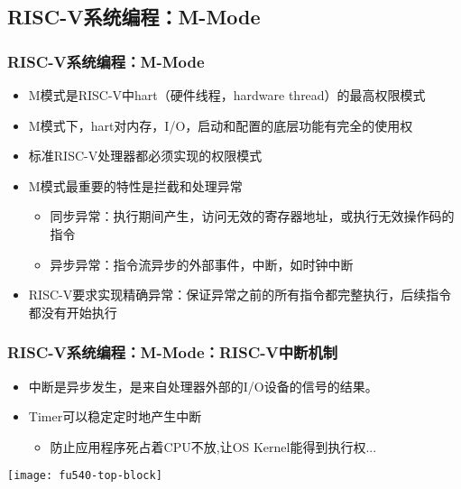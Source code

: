 \subsection{RISC-V系统编程：M-Mode}
\begin{frame}
    \frametitle{RISC-V系统编程：M-Mode}
    \begin{itemize}
        \item M模式是RISC-V中hart（硬件线程，hardware thread）的最高权限模式       
        \item M模式下，hart对内存，I/O，启动和配置的底层功能有完全的使用权
        \item 标准RISC-V处理器都必须实现的权限模式
        \item M模式最重要的特性是拦截和处理异常
        \begin{itemize}
            \item 同步异常：执行期间产生，访问无效的寄存器地址，或执行无效操作码的指令
            \item 异步异常：指令流异步的外部事件，中断，如时钟中断
        \end{itemize}				
        \item RISC-V要求实现精确异常：保证异常之前的所有指令都完整执行，后续指令都没有开始执行
    \end{itemize}
    
\end{frame}


\begin{frame}[plain]
    \frametitle{RISC-V系统编程：M-Mode：RISC-V中断机制}
    \begin{itemize}
        \item 中断是异步发生，是来自处理器外部的I/O设备的信号的结果。
        
        
        \item Timer可以稳定定时地产生中断
        \begin{itemize}
            \item 防止应用程序死占着CPU不放,让OS Kernel能得到执行权...
        \end{itemize}				
        
    \end{itemize}
    
    \centering
    \texttt{[image: fu540-top-block]}
    
\end{frame}

